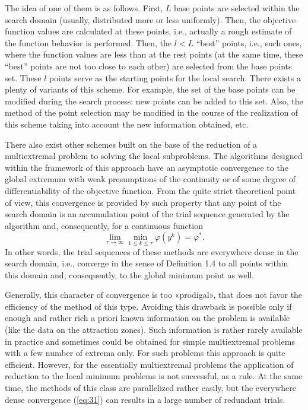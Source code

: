 The idea of one of them is as follows. First, $L$ base points are selected within the search domain (usually, distributed more or less uniformly). Then, the objective function values are calculated at these points, i.e., actually a rough estimate of the function behavior is performed. Then, the $l<L$  “best” points, i.e., such ones, where the function values are less than at the rest points (at the same time, these “best” points are not too close to each other) are selected from the base points set. These $l$ points serve as the starting points for the local search. There exists a plenty of variants of this scheme. For example, the set of the base points can be modified during the search process: new points can be added to this set. Also, the method of  the point selection may be modified in the course  of the realization of this scheme taking into account the new information obtained, etc. 

There also exist other schemes built on the base of the reduction of a multiextremal problem to solving the local subproblems. The algorithms designed within the framework of this approach have an asymptotic convergence to the global extremum with weak presumptions of the continuity or of some degree of differentiability of the objective function. From the quite strict theoretical point of view, this convergence is provided by such property that any point of the search domain is an accumulation point of the trial sequence   generated by the algorithm and, consequently, for a continuous function
\begin{equation}
\label{eq:31}
\lim_{\tau \to \infty}\min_{1\leq k \leq \tau}{\varphi(y^k)}=\varphi^*.
\end{equation}
In other words, the trial sequences of these methods are everywhere dense in the search domain, i.e., converge in the sense of Definition 1.4 to all points within this domain and, consequently, to the global minimum point as well. 

Generally, this character of convergence is too «prodigal», that does not favor the efficiency of the method of this type. Avoiding this drawback is possible only if enough and rather rich a priori known information on the problem is available (like the data on the attraction zones). Such information is rather rarely available in practice and sometimes could be obtained for simple multiextremal problems with a few number of extrema only. For such problems this approach is quite efficient. However, for the essentially multiextremal problems the application of reduction to the local minimum problems is not successful, as a rule. At the same time, the methods of this class are parallelized rather easily, but the everywhere dense convergence (\ref{eq:31}) can results in a large number of redundant trials. 

